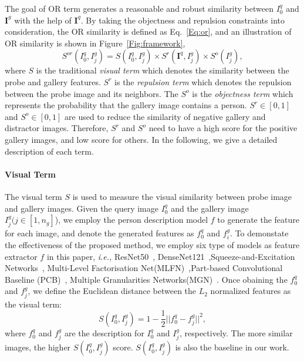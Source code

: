 \documentclass[journal]{IEEEtran}
\begin{document}
The goal of OR term generates a reasonable and robust similarity between $I^{q}_{0}$ and $\boldsymbol{I}^{g}$ with the help of $\boldsymbol{I}^{q}$. By taking the objectness and repulsion constraints into consideration, the OR similarity is defined as Eq.~\eqref{Eq:or}, and an illustration of OR similarity is shown in Figure~\ref{Fig:framework},
\begin{equation}
\label{Eq:or}
S^{or}(I^{q}_{0},I^{g}_{j})=S(I^{q}_{0},I^{g}_{j})\times S^{r}(\boldsymbol{I}^{q},I^{g}_{j})\times S^{o}(I^{g}_{j}),
\end{equation}
where $S$ is the traditional \emph{visual term} which denotes the similarity between the probe and gallery features. $S^{r}$ is the \emph{repulsion term} which denotes the repulsion between the probe image and its neighbors. The $S^{o}$ is the \emph{objectness term} which represents the probability that the gallery image contains a person. $S^{r}\in [0,1]$ and $S^{o}\in[0,1]$ are used to reduce the similarity of negative  gallery and distractor images. Therefore, $S^{r}$ and $S^{o}$ need to have a high score for the positive gallery images, and low score for others. In the following, we give a detailed description of each term.

\paragraph{Visual Term} The visual term $S$ is used to measure the visual similarity between probe image and gallery images. Given the query image $I^{q}_{0}$ and the gallery image $I^{g}_{j} (j\in[1,n_{g}]$), we employ the person description model $f$ to generate the feature for each image, and denote the generated features as $f^{q}_{0}$ and $f^{g}_{i}$. 
To demonstate the effectiveness of the proposed method, we employ six type of models as feature extractor $f$ in this paper, \emph{i.e.,} ResNet50~\cite{HeZRS15}, DenseNet121~\cite{HuangLMW17},Squeeze-and-Excitation Networks~\cite{HuSS18}, Multi-Level Factorisation Net(MLFN)~\cite{ChangHX18},Part-based Convolutional Baseline (PCB)~\cite{SunZYTW18}, Multiple Granularities Networks(MGN)~\cite{WangYCLZ18}. Once obaining the $f^{q}_{0}$ and $f^{g}_{j}$, we define the Euclidean distance between the $L_{2}$ normalized features as the visual term:
\begin{equation}
\label{Eq:S}
S(I^{q}_{0},I^{g}_{j})=1-\frac{1}{2}||f^{q}_{0}-f^{g}_{j}||^{2},
\end{equation}
where $f^{q}_{0}$ and $f^{g}_{j}$ are the description for $I^{q}_{0}$ and $I^{g}_{j}$, respectively.
The more similar images, the higher $S(I^{q}_{0},I^{g}_{j})$ score. $S(I^{q}_{0},I^{g}_{j})$ is also the baseline in our work.
\end{document}
